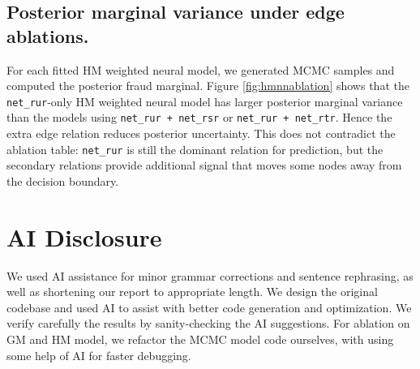 \documentclass[10pt,reqno]{amsart}
\begin{document}
\subsection{Posterior marginal variance under edge ablations.}
For each fitted HM weighted neural model, we generated MCMC samples and computed the posterior fraud marginal.
Figure \ref{fig:hmnnablation} shows that the \texttt{net\_rur}-only HM weighted neural model has larger posterior marginal variance than the models using \texttt{net\_rur + net\_rsr} or \texttt{net\_rur + net\_rtr}. Hence the extra edge relation reduces posterior uncertainty. This does not contradict the ablation table: \texttt{net\_rur} is still the dominant relation for prediction, but the secondary relations provide additional signal that moves some nodes away
from the decision boundary.


\section*{AI Disclosure}
We used AI assistance for minor grammar corrections and sentence rephrasing, as well as shortening our report to appropriate length. We design the original codebase and used AI to assist with better code generation and optimization. We verify carefully the results by sanity-checking the AI suggestions.
For ablation on GM and HM model, we refactor the MCMC model code ourselves, with using some help of AI for faster debugging. 

\end{document}
